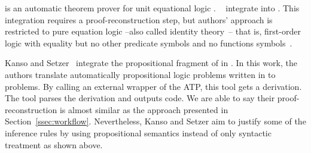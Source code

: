 \documentclass[../main.tex]{subfiles}
\begin{document}




 is an automatic theorem prover for unit
equational logic \cite{hillenbrand1997}.
\citeauthor{foster2011integrating}~\cite{foster2011integrating}
integrate  into \Agda
\cite{agdateam}. This integration requires a proof-reconstruction
step, but authors' approach is restricted to pure equation logic
--also called identity theory~\cite{humberstone2011}-- that is,
first-order logic with equality but no other predicate symbols and
no functions symbols~\cite{appel1959}.

Kanso and Setzer~\cite{kanso2016light} integrate the propositional
fragment of  in \Agda. In this work, the authors
translate automatically propositional logic problems written in \Agda
to \TPTP problems. By calling an external wrapper of the ATP, this
tool gets a \TSTP derivation. The tool parses the 
derivation and outputs \Agda code.
We are able to say their proof-reconstruction is almost
similar as the approach presented in Section~\ref{ssec:workflow}.
Nevertheless, Kanso and Setzer aim to justify some of the inference
rules by using propositional semantics instead of only syntactic
treatment as shown above.
\end{document}
